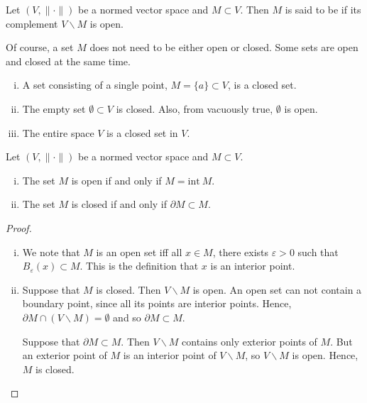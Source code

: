 \documentclass[10pt]{article}
\let\emph\relax %
\begin{document}
  \begin{definition}
    Let $(V,\|\cdot\|)$ be a normed vector space and $M \subset V$. 
    Then $M$ is said to be \emph{closed} if its complement $V \backslash M$ is open.
  \end{definition}

  \begin{remark}
    Of course, a set $M$ does not need to be either open or closed.
    Some sets are open and closed at the same time.
  \end{remark}

  \begin{example}
    \begin{enumerate}[(i)]
      \item A set consisting of a single point, $M = \{a\} \subset V$, is a closed set.
      \item The empty set $\emptyset \subset V$ is closed. Also, from vacuously true, $\emptyset$ is open.
      \item The entire space $V$ is a closed set in $V$.
    \end{enumerate}
  \end{example}

  \begin{lemma}
    Let $(V,\|\cdot\|)$ be a normed vector space and $M \subset V$.
    \begin{enumerate}[(i)]
      \item The set $M$ is open if and only if $M = \text{int}~M$.
      \item The set $M$ is closed if and only if $\partial M \subset M$.
    \end{enumerate}
  \end{lemma}

  \begin{proof}
    \begin{enumerate}[(i)]
      \item We note that $M$ is an open set iff all $x \in M$, there exists $\varepsilon > 0$ such that $B_{\varepsilon}(x) \subset M$.
      This is the definition that $x$ is an interior point.
      \item Suppose that $M$ is closed. Then $V \backslash M$ is open. An open set can not contain a boundary point, since
      all its points are interior points. Hence, $\partial M \cap (V \backslash M) = \emptyset$ and so $\partial M \subset M$.
      
      Suppose that $\partial M \subset M$. Then $V \backslash M$ contains only exterior points of $M$. 
      But an exterior point of $M$ is an interior point of $V \backslash M$, so $V \backslash M$ is open.
      Hence, $M$ is closed.
    \end{enumerate}
  \end{proof}
\end{document}
